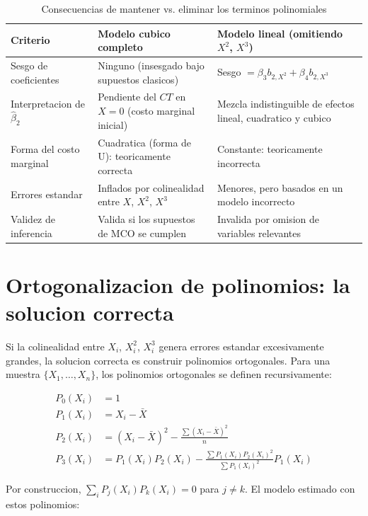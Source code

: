\documentclass[12pt, letterpaper]{article}
\theoremstyle{remark}
\begin{document}
\begin{table}[ht]
\centering
\caption{Consecuencias de mantener vs. eliminar los terminos polinomiales}
\label{tab:comparacion}
\small
\begin{tabular}{p{3.5cm} p{5cm} p{5cm}}
\toprule
\textbf{Criterio}
  & \textbf{Modelo cubico completo}
  & \textbf{Modelo lineal (omitiendo $X^2$, $X^3$)} \\
\midrule
Sesgo de coeficientes
  & Ninguno (insesgado bajo supuestos clasicos)
  & Sesgo $= \beta_3 b_{2,X^2} + \beta_4 b_{2,X^3}$ \\[4pt]
Interpretacion de $\hat\beta_2$
  & Pendiente del $CT$ en $X=0$ (costo marginal inicial)
  & Mezcla indistinguible de efectos lineal, cuadratico y cubico \\[4pt]
Forma del costo marginal
  & Cuadratica (forma de U): teoricamente correcta
  & Constante: teoricamente incorrecta \\[4pt]
Errores estandar
  & Inflados por colinealidad entre $X$, $X^2$, $X^3$
  & Menores, pero basados en un modelo incorrecto \\[4pt]
Validez de inferencia
  & Valida si los supuestos de MCO se cumplen
  & Invalida por omision de variables relevantes \\
\bottomrule
\end{tabular}
\end{table}

\appendix

\section{Ortogonalizacion de polinomios: la solucion correcta}

Si la colinealidad entre $X_i$, $X_i^2$, $X_i^3$ genera errores estandar
excesivamente grandes, la solucion correcta es construir polinomios ortogonales.
Para una muestra $\{X_1, \ldots, X_n\}$, los polinomios ortogonales se definen
recursivamente:

\begin{align}
  P_0(X_i) &= 1
  \label{eq:P0}\\
  P_1(X_i) &= X_i - \bar X
  \label{eq:P1}\\
  P_2(X_i) &= (X_i - \bar X)^2 - \frac{\sum (X_i - \bar X)^2}{n}
  \label{eq:P2}\\
  P_3(X_i) &= P_1(X_i)P_2(X_i) - \frac{\sum P_1(X_i)P_2(X_i)^2}{\sum P_1(X_i)^2} P_1(X_i)
  \label{eq:P3}
\end{align}

Por construccion, $\sum_i P_j(X_i) P_k(X_i) = 0$ para $j \neq k$. El modelo
estimado con estos polinomios:
\end{document}
